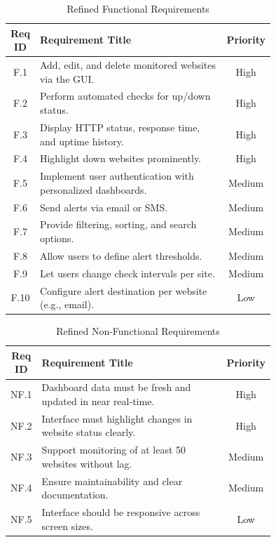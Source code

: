 \begin{table}[H]
    \centering
    \caption{Refined Functional Requirements}
    \label{tab:functional_reqs_refined}
    \begin{tabular}{|c|>{\raggedright\arraybackslash}p{0.75\linewidth}|c|}
        \hline
        \textbf{Req ID} & \textbf{Requirement Title} & \textbf{Priority} \\
        \hline
        F.1 & Add, edit, and delete monitored websites via the GUI. & High \\
        \hline
        F.2 & Perform automated checks for up/down status. & High \\
        \hline
        F.3 & Display HTTP status, response time, and uptime history. & High \\
        \hline
        F.4 & Highlight down websites prominently. & High \\
        \hline
        F.5 & Implement user authentication with personalized dashboards. & Medium \\
        \hline
        F.6 & Send alerts via email or SMS. & Medium \\
        \hline
        F.7 & Provide filtering, sorting, and search options. & Medium \\
        \hline
        F.8 & Allow users to define alert thresholds. & Medium \\
        \hline
        F.9 & Let users change check intervals per site. & Medium \\
        \hline
        F.10 & Configure alert destination per website (e.g., email). & Low \\
        \hline
    \end{tabular}
\end{table}

\begin{table}[H]
    \centering
    \caption{Refined Non-Functional Requirements}
    \label{tab:nonfunctional_reqs_refined}
    \begin{tabular}{|c|>{\raggedright\arraybackslash}p{0.75\linewidth}|c|}
        \hline
        \textbf{Req ID} & \textbf{Requirement Title} & \textbf{Priority} \\
        \hline
        NF.1 & Dashboard data must be fresh and updated in near real-time. & High \\
        \hline
        NF.2 & Interface must highlight changes in website status clearly. & High \\
        \hline
        NF.3 & Support monitoring of at least 50 websites without lag. & Medium \\
        \hline
        NF.4 & Ensure maintainability and clear documentation. & Medium \\
        \hline
        NF.5 & Interface should be responsive across screen sizes. & Low \\
        \hline
    \end{tabular}
\end{table}

